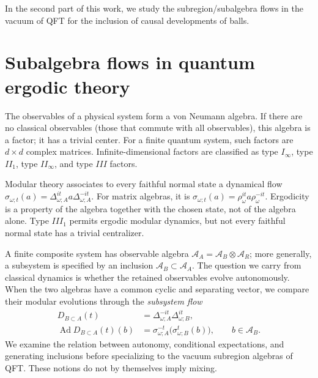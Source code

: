 \documentclass[a4paper,11pt]{article}
\theoremstyle{definition}
\newcommand{\mA}{\mathcal{A}}
\newcommand{\nn}{\nonumber}
\newcommand{\NL}[1]{\textcolor{blue}{#1}}
\begin{document}
In the second part of this work, we study the subregion/subalgebra flows in the vacuum of QFT for the inclusion of causal developments of balls.











\section{Subalgebra flows in quantum ergodic theory}\label{section:basics}

The observables of a physical system form a von Neumann algebra. If there are no classical observables (those that commute with all observables), this algebra is a factor; it has a trivial center. For a finite quantum system, such factors are $d\times d$ complex matrices. Infinite-dimensional factors are classified as type $I_\infty$, type $II_1$, type $II_\infty$, and type $III$ factors.

Modular theory associates to every faithful normal state a dynamical flow
$\sigma_{\omega;t}(a)=\Delta_{\omega;A}^{it}a\Delta_{\omega;A}^{-it}$.
For matrix algebras, it is $\sigma_{\omega;t}(a)=\rho_\omega^{it}a\rho_\omega^{-it}$.
Ergodicity is a property of the algebra together with the chosen state, not of the algebra alone. Type $III_1$ permits ergodic modular dynamics, but not every faithful normal state has a trivial centralizer.

A finite composite system has observable algebra $\mA_A=\mA_B\otimes\mA_R$; more generally, a subsystem is specified by an inclusion $\mA_B\subset\mA_A$. The question we carry from classical dynamics is whether the retained observables evolve autonomously. When the two algebras have a common cyclic and separating vector, we compare their modular evolutions through the {\it subsystem flow}
\begin{align}
 D_{B\subset A}(t)&=\Delta_{\omega;A}^{-it}\Delta_{\omega;B}^{it},\nn\\
 \operatorname{Ad}D_{B\subset A}(t)(b)
 &=\sigma_{\omega;A}^{-t}\bigl(\sigma_{\omega;B}^t(b)\bigr),
 \qquad b\in\mA_B.
\end{align}
We examine the relation between autonomy, conditional expectations, and generating inclusions before specializing to the vacuum subregion algebras of QFT. These notions do not by themselves imply mixing.
\end{document}

